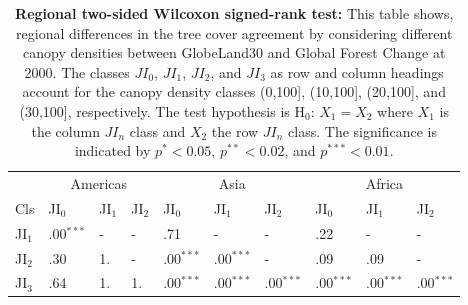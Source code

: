 			\begin{table}[ht]
				\centering
				\caption[Regional two-sided Wilcoxon signed-rank test]{\textbf{Regional two-sided Wilcoxon signed-rank test:} This table shows, regional differences in the tree cover agreement by considering different canopy densities between GlobeLand30 and Global Forest Change at 2000. The classes $JI_0$, $JI_1$, $JI_2$, and $JI_3$ as row and column headings account for the canopy density classes (0,100], (10,100], (20,100], and (30,100], respectively. The test hypothesis is H$_0$: $X_1=X_2$ where $X_1$ is the column $JI_n$ class and $X_2$ the row $JI_n$ class. The significance is indicated by $p^{*}<0.05$, $p^{**}<0.02$, and $p^{***}<0.01$.}
				\label{tab:wilcoxontwosided_regions}
				\begin{tabular}{llllllllll}
					\hline
					& \multicolumn{3}{|c}{Americas} & \multicolumn{3}{|c|}{Asia} & \multicolumn{3}{c|}{Africa} \\
					Cls & JI$_0$ & JI$_1$ & JI$_2$ & JI$_0$ & JI$_1$ & JI$_2$ & JI$_0$ & JI$_1$ & JI$_2$ \\\hline
					JI$_1$ & .00$^{***}$ & - & - & .71 & - & - & .22 & - & - \\
					JI$_2$ & .30 & 1. & - & .00$^{***}$ & .00$^{***}$ & - & .09 & .09  & - \\
					JI$_3$ & .64 & 1. & 1. & .00$^{***}$ & .00$^{***}$ & .00$^{***}$ & .00$^{***}$ & .00$^{***}$ & .00$^{***}$ \\\hline
				\end{tabular}
			\end{table}
